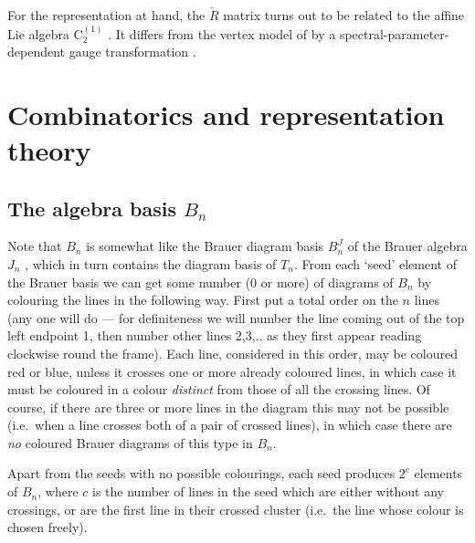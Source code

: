 \documentclass[12pt]{iopart}
\newcommand{\BBase}{B^J}
\begin{document}
For the representation at hand, the $\check{R}$ matrix turns out to be
related to the affine Lie algebra C$_{2}^{(1)}$ \cite{J86}. It differs
from the vertex model of \cite{J86} by a
spectral-parameter-dependent gauge transformation \cite{GP93}.


\section{Combinatorics and representation theory}\label{Sbasis}
\setcounter{paragraph}{0}

\subsection{The algebra basis $B_n$}

Note that $B_n$ is somewhat like the Brauer diagram basis $\BBase_n$
of the Brauer algebra $J_n$ \cite{B37}, which in turn contains the
diagram basis of $T_n$.  From each `seed' element of the Brauer basis
we can get some number (0 or more) of diagrams of $B_n$ by colouring
the lines in the following way.  First put a total order on the $n$
lines (any one will do --- for definiteness we will number the line
coming out of the top left endpoint 1, then number other lines
2,3,.. as they first appear reading clockwise round the frame).  Each
line, considered in this order, may be coloured red or blue, unless it
crosses one or more already coloured lines, in which case it must be
coloured in a colour {\em distinct}\/ from those of all the crossing
lines. Of course, if there are three or more lines in the diagram this
may not be possible (i.e.\ when a line crosses both of a pair of
crossed lines), in which case there are {\em no}\/ coloured Brauer
diagrams of this type in $B_n$.

Apart from the seeds with no possible colourings, each seed produces
$2^c$ elements of $B_n$, where $c$ is the number of lines in the seed
which are either without any crossings, or are the first line in their
crossed cluster (i.e.\ the line whose colour is chosen freely).
\end{document}
